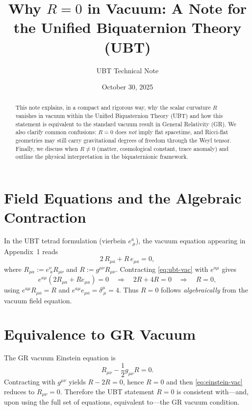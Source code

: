 \documentclass[12pt]{article}
\title{\textbf{Why $R=0$ in Vacuum: A Note for the Unified Biquaternion Theory (UBT)}}
\author{UBT Technical Note}
\date{October 30, 2025}
\begin{document}
\maketitle

\begin{abstract}
This note explains, in a compact and rigorous way, why the scalar curvature $R$ vanishes in vacuum within the Unified Biquaternion Theory (UBT) and how this statement is equivalent to the standard vacuum result in General Relativity (GR). We also clarify common confusions: $R=0$ does \emph{not} imply flat spacetime, and Ricci-flat geometries may still carry gravitational degrees of freedom through the Weyl tensor. Finally, we discuss when $R\neq 0$ (matter, cosmological constant, trace anomaly) and outline the physical interpretation in the biquaternionic framework.
\end{abstract}

\section{Field Equations and the Algebraic Contraction}
In the UBT tetrad formulation (vierbein $e^a_{\ \mu}$), the vacuum equation appearing in Appendix~1 reads
\begin{equation}
2\,R_{\mu a} + R\, e_{\mu a} = 0,
\label{eq:ubt-vac}
\end{equation}
where $R_{\mu a} := e^\nu_{\ a} R_{\mu\nu}$ and $R := g^{\mu\nu}R_{\mu\nu}$.
Contracting \eqref{eq:ubt-vac} with $e^{a\mu}$ gives
\begin{equation}
e^{a\mu}(2 R_{\mu a} + R e_{\mu a}) = 0 \quad \Rightarrow\quad 2R + 4R = 0 \quad \Rightarrow\quad R=0,
\end{equation}
using $e^{a\mu}R_{\mu a}=R$ and $e^{a\mu}e_{\mu a}=\delta^\mu_{\ \mu}=4$.
Thus $R=0$ follows \emph{algebraically} from the vacuum field equation.

\section{Equivalence to GR Vacuum}
The GR vacuum Einstein equation is
\begin{equation}
R_{\mu\nu} - \frac{1}{2} g_{\mu\nu} R = 0.
\label{eq:einstein-vac}
\end{equation}
Contracting with $g^{\mu\nu}$ yields $R-2R=0$, hence $R=0$ and then \eqref{eq:einstein-vac} reduces to $R_{\mu\nu}=0$.
Therefore the UBT statement $R=0$ is consistent with---and, upon using the full set of equations, equivalent to---the GR vacuum condition.
\end{document}
